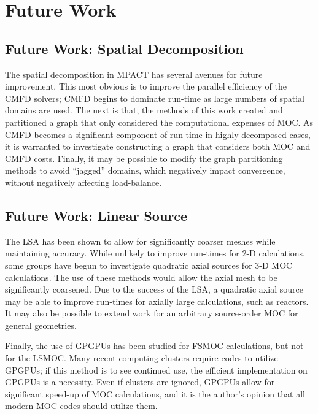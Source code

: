 {  \section{Future Work}{\label{sec:Future Work}

    \subsection{Future Work: Spatial Decomposition}{\label{ssec:Future Work:Spatial Decomposition}
      The spatial decomposition in MPACT has several avenues for future improvement.
      This most obvious is to improve the parallel efficiency of the \ac{CMFD} solvers; \ac{CMFD} begins to dominate run-time as large numbers of spatial domains are used.
      The next is that, the methods of this work created and partitioned a graph that only considered the computational expenses of \ac{MOC}.
      As \ac{CMFD} becomes a significant component of run-time in highly decomposed cases, it is warranted to investigate constructing a graph that considers both \ac{MOC} and \ac{CMFD} costs.
      Finally, it may be possible to modify the graph partitioning methods to avoid ``jagged'' domains, which negatively impact convergence, without negatively affecting load-balance.
    }

    \subsection{Future Work: Linear Source}{\label{ssec:Future Work:Linear Source}
      The \ac{LSA} has been shown to allow for significantly coarser meshes while maintaining accuracy.
      While unlikely to improve run-times for 2-D calculations, some groups have begun to investigate quadratic axial sources for 3-D \ac{MOC} calculations. %
      The use of these methods would allow the axial mesh to be significantly coarsened.
      Due to the success of the \ac{LSA}, a quadratic axial source may be able to improve run-times for axially large calculations, such as reactors.
      It may also be possible to extend  work for an arbitrary source-order \ac{MOC} for general geometries.

      Finally, the use of \acp{GPGPU} has been studied for \ac{FSMOC} calculations, but not for the \ac{LSMOC}. %
      Many recent computing clusters require codes to utilize \acp{GPGPU}; if this method is to see continued use, the efficient implementation on \acp{GPGPU} is a necessity.
      Even if clusters are ignored, \acp{GPGPU} allow for significant speed-up of \ac{MOC} calculations, and it is the author's opinion that all modern \ac{MOC} codes should utilize them.
    }

}}
